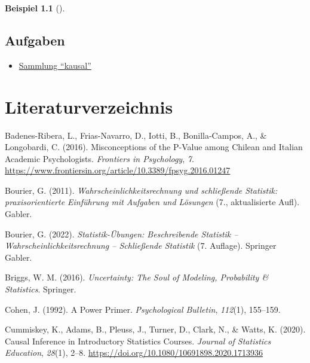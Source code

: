 \documentclass[
  ngerman,
  letterpaper,
  twoside,
  open=any]{scrbook}
\providecommand{\tightlist}{%
  \setlength{\itemsep}{0pt}\setlength{\parskip}{0pt}}\usepackage{longtable,booktabs,array}
\newlength{\cslhangindent}
\newenvironment{CSLReferences}[2] %
 {\begin{list}{}{%
  \setlength{\itemindent}{0pt}
  \setlength{\leftmargin}{0pt}
  \setlength{\parsep}{0pt}
  \ifodd #1
   \setlength{\leftmargin}{\cslhangindent}
   \setlength{\itemindent}{-1\cslhangindent}
  \fi
  \setlength{\itemsep}{#2\baselineskip}}}
 {\end{list}}
\theoremstyle{definition}
\newtheorem{example}{Beispiel}[chapter]
\theoremstyle{plain}
\theoremstyle{definition}
\theoremstyle{definition}
\theoremstyle{remark}
\begin{document}
\begin{example}[]
\section{Aufgaben}\label{aufgaben-12}

\begin{itemize}
\tightlist
\item
  \href{https://datenwerk.netlify.app/\#category=causal}{Sammlung
  \enquote{kausal}}
\end{itemize}

\chapter*{Literaturverzeichnis}\label{literaturverzeichnis}


\protect{}\label{refs}
\begin{CSLReferences}{1}{0}
Badenes-Ribera, L., Frias-Navarro, D., Iotti, B., Bonilla-Campos, A., \&
Longobardi, C. (2016). Misconceptions of the P-Value among {Chilean} and
{Italian Academic Psychologists}. \emph{Frontiers in Psychology},
\emph{7}.
\url{https://www.frontiersin.org/article/10.3389/fpsyg.2016.01247}

Bourier, G. (2011). \emph{Wahrscheinlichkeitsrechnung und schließende
Statistik: praxisorientierte Einführung mit Aufgaben und Lösungen} (7.,
aktualisierte Aufl). Gabler.

Bourier, G. (2022). \emph{Statistik-Übungen: {Beschreibende} Statistik
-- Wahrscheinlichkeitsrechnung -- Schließende Statistik} (7. Auflage).
Springer Gabler.

Briggs, W. M. (2016). \emph{Uncertainty: {The Soul} of {Modeling},
{Probability} \& {Statistics}}. Springer.

Cohen, J. (1992). A Power Primer. \emph{Psychological Bulletin},
\emph{112}(1), 155--159.

Cummiskey, K., Adams, B., Pleuss, J., Turner, D., Clark, N., \& Watts,
K. (2020). Causal {Inference} in {Introductory Statistics Courses}.
\emph{Journal of Statistics Education}, \emph{28}(1), 2--8.
\url{https://doi.org/10.1080/10691898.2020.1713936}


\end{CSLReferences}
\end{example}
\end{document}
